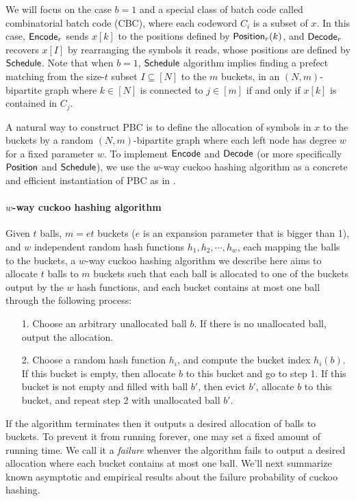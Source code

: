We will focus on the case $b=1$ and a special class of batch code called combinatorial batch code (CBC)\cite{cryptoeprint:2017/1142,10.1145/1007352.1007396,cryptoeprint:2008/306}, where each codeword $C_i$ is a subset of $x$. In this case, ${\sf Encode}_r$ sends $x[k]$ to the positions defined by ${\sf Position}_r(k)$, and ${\sf Decode}_r$ recovers $x[I]$ by rearranging the symbols it reads, whose positions are defined by ${\sf Schedule}$. Note that when $b=1$, ${\sf Schedule}$ algorithm implies finding a prefect matching from the size-$t$ subset $I\subseteq[N]$ to the $m$ buckets, in an $(N,m)$-bipartite graph where $k\in[N]$ is connected to $j\in[m]$ if and only if $x[k]$ is contained in $C_j$. 

A natural way to construct PBC is to define the allocation of symbols in $x$ to the buckets by a random $(N,m)$-bipartite graph where each left node has degree $w$ for a fixed parameter $w$. To implement ${\sf Encode}$ and ${\sf Decode}$ (or more specifically ${\sf Position}$ and ${\sf Schedule}$), we use the $w$-way cuckoo hashing algorithm\cite{10.1007/3-540-44676-1_10} as a concrete and efficient instantiation of PBC as in \cite{cryptoeprint:2017/1142,cryptoeprint:2018/579,yeo_cuckoo_2023}. 

\paragraph{$w$-way cuckoo hashing algorithm}Given $t$ balls, $m=et$ buckets ($e$ is an expansion parameter that is bigger than 1), and $w$ independent random hash functions $h_1, h_2,\cdots, h_w$, each mapping the balls to the buckets, a $w$-way cuckoo hashing algorithm we describe here aims to allocate $t$ balls to $m$ buckets such that each ball is allocated to one of the buckets output by the $w$ hash functions, and each bucket contains at most one ball through the following process: 
\begin{itemize}
  \item[1.] Choose an arbitrary unallocated ball $b$. If there is no unallocated ball, output the allocation. 
  \item[2.] Choose a random hash function $h_i$, and  compute the bucket index $h_i(b)$. If this bucket is empty, then allocate $b$ to this bucket and go to step 1. If this bucket is not empty and filled with ball $b'$, then evict $b'$, allocate $b$ to this bucket,  and repeat step 2 with unallocated ball $b'$. 
\end{itemize}
If the algorithm terminates then it outputs a desired allocation of balls to buckets. To prevent it from running forever, one may set a fixed amount of running time. We call it a \emph{failure} whenver the algorithm fails to output a desired allocation where each bucket contains at most one ball. We'll next summarize known asymptotic and empirical results about the failure probability of cuckoo hashing. 

